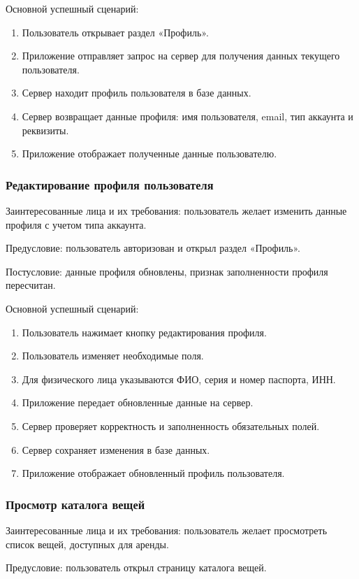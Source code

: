 Основной успешный сценарий:

\begin{enumerate}
    \item Пользователь открывает раздел «Профиль».
    \item Приложение отправляет запрос на сервер для получения данных текущего пользователя.
    \item Сервер находит профиль пользователя в базе данных.
    \item Сервер возвращает данные профиля: имя пользователя, email, тип аккаунта и реквизиты.
    \item Приложение отображает полученные данные пользователю.
\end{enumerate}

\subsubsection{Редактирование профиля пользователя}
Заинтересованные лица и их требования: пользователь желает изменить данные профиля с учетом типа аккаунта.

Предусловие: пользователь авторизован и открыл раздел «Профиль».

Постусловие: данные профиля обновлены, признак заполненности профиля пересчитан.

Основной успешный сценарий:
\begin{enumerate}
    \item Пользователь нажимает кнопку редактирования профиля.
    \item Пользователь изменяет необходимые поля.
    \item Для физического лица указываются ФИО, серия и номер паспорта, ИНН.
    \item Приложение передает обновленные данные на сервер.
    \item Сервер проверяет корректность и заполненность обязательных полей.
    \item Сервер сохраняет изменения в базе данных.
    \item Приложение отображает обновленный профиль пользователя.
\end{enumerate}
\subsubsection{Просмотр каталога вещей}
Заинтересованные лица и их требования: пользователь желает просмотреть список вещей, доступных для аренды.

Предусловие: пользователь открыл страницу каталога вещей.

